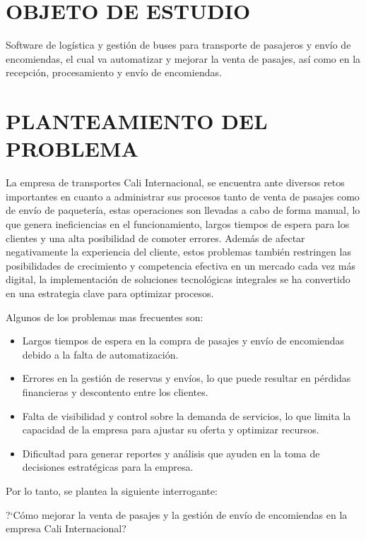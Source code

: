 \section{OBJETO DE ESTUDIO}

	Software de logística y gestión de buses para transporte de pasajeros y envío de encomiendas, el cual va automatizar y mejorar la venta de pasajes, así como en la recepción, procesamiento y envío de encomiendas.
	
\section{PLANTEAMIENTO DEL PROBLEMA}

	La empresa de transportes Cali Internacional, se encuentra ante diversos retos importantes en cuanto a administrar sus procesos tanto de venta de pasajes como de envío de paquetería, estas operaciones son llevadas a cabo de forma manual, lo que genera ineficiencias en el funcionamiento, largos tiempos de espera para los clientes y una alta posibilidad de comoter errores. Además de afectar negativamente la experiencia del cliente, estos problemas también restringen las posibilidades de crecimiento y competencia efectiva en un mercado cada vez más digital, la implementación de soluciones tecnológicas integrales se ha convertido en una estrategia clave para optimizar procesos.  
	
	Algunos de los problemas mas frecuentes son:
	
	\begin{itemize}[label=$\bullet$, left=1.25cm, labelsep = 0.75cm, topsep = 0pt, parsep = 0pt]
		\item Largos tiempos de espera en la compra de pasajes y envío de encomiendas debido a la falta de automatización.
		\item Errores en la gestión de reservas y envíos, lo que puede resultar en pérdidas financieras y descontento entre los clientes.
		\item Falta de visibilidad y control sobre la demanda de servicios, lo que limita la capacidad de la empresa para ajustar su oferta y optimizar recursos.
		\item Dificultad para generar reportes y análisis que ayuden en la toma de decisiones estratégicas para la empresa.    
	\end{itemize}
	
	Por lo tanto, se plantea la siguiente interrogante:
	
	?`Cómo mejorar la venta de pasajes y la gestión de envío de encomiendas en la empresa Cali Internacional?
	
